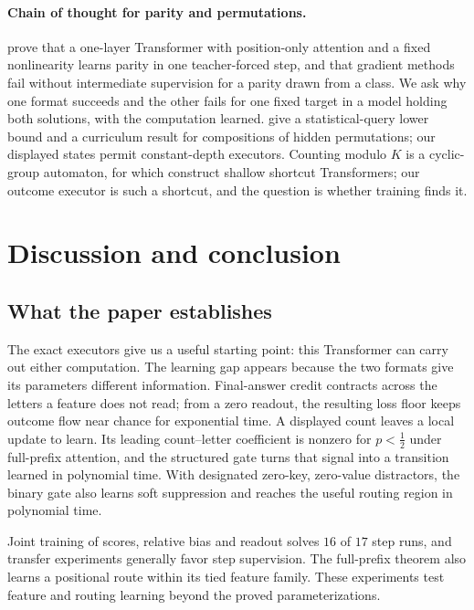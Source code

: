 \paragraph{Chain of thought for parity and permutations.} \citet{kim2024parity} prove that a one-layer Transformer with
position-only attention and a fixed nonlinearity learns parity in one teacher-forced step, and that gradient methods fail
without intermediate supervision for a parity drawn from a class. We ask why one format succeeds and the other fails for
one fixed target in a model holding both solutions, with the computation learned. \citet{wang2025compositional} give a
statistical-query lower bound and a curriculum result for compositions of hidden permutations; our displayed states
permit constant-depth executors. Counting modulo $K$ is a cyclic-group automaton, for which \citet{liu2023automata} construct
shallow shortcut Transformers; our outcome executor is such a shortcut, and the question is whether training finds it.

\section{Discussion and conclusion}
\label{sec:conclusion}
\label{sec:discussion}

\subsection{What the paper establishes}
The exact executors give us a useful starting point: this Transformer can carry out either computation. The learning gap appears
because the two formats give its parameters different information. Final-answer credit contracts across the letters a feature does
not read; from a zero readout, the resulting loss floor keeps outcome flow near chance for exponential time. A displayed count
leaves a local update to learn. Its leading count--letter coefficient is nonzero for $p<\tfrac{1}{2}$ under full-prefix attention,
and the structured gate turns that signal into a transition learned in polynomial time. With designated zero-key, zero-value
distractors, the binary gate also learns soft suppression and reaches the useful routing region in polynomial time.

Joint training of scores, relative bias and readout solves $16$ of $17$ step runs, and transfer experiments generally favor step
supervision. The full-prefix theorem also learns a positional route within its tied feature family.
These experiments test feature and routing learning beyond the proved parameterizations.

